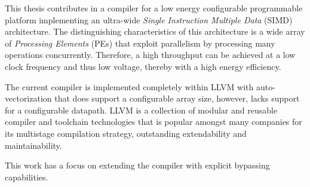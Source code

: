 


This thesis contributes in a compiler for a low energy configurable programmable platform implementing an ultra-wide \emph{Single Instruction Multiple Data} (SIMD) architecture. The distinguishing characteristics of this architecture is a wide array of \emph{Processing Elements} (PEs) that exploit parallelism by processing many operations concurrently. Therefore, a high throughput can be achieved at a low clock frequency and thus low voltage, thereby with a high energy efficiency.

The current compiler is implemented completely within LLVM with auto-vectorization that does support a configurable array size, however, lacks support for a configurable datapath. LLVM is a collection of modular and reusable compiler and toolchain technologies that is popular amongst many companies for its multistage compilation strategy, outstanding extendability and maintainability. 
 
This work has a focus on extending the compiler with explicit bypassing capabilities. 

\vspace{10mm}
 \keywords